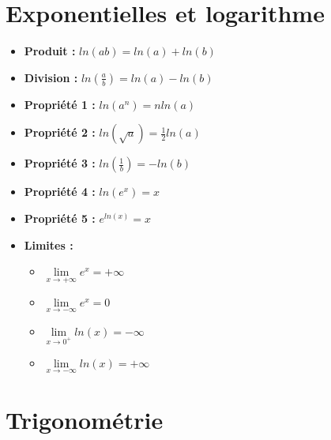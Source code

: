\documentclass[12]{article}%
\theoremstyle{plain}
\theoremstyle{definition}
\theoremstyle{remark}
\begin{document}
\section{Exponentielles et logarithme}
\large
\begin{itemize}
	\item \textbf{Produit :} \( \boxed{ln(ab) = ln(a) + ln(b)} \)
	\item \textbf{Division :} \( \boxed{ln(\frac{a}{b}) = ln(a) - ln(b)} \)
	\item \textbf{Propriété 1 :} \( \boxed{ln(a^{n}) = nln(a)} \)
	\item \textbf{Propriété 2 :} \( \boxed{ln(\sqrt{a}) = \frac{1}{2}ln(a)} \)
	\item \textbf{Propriété 3 :} \( \boxed{ln(\frac{1}{b}) = -ln(b)} \)
	\item \textbf{Propriété 4 :} \( \boxed{ln(e^{x}) = x} \)
	\item \textbf{Propriété 5 :} \( \boxed{e^{ln(x)} = x} \)
	\item \textbf{Limites :}
	\begin{itemize}
		\item \( \boxed{\lim\limits_{x \to +\infty} e^{x} = +\infty} \)
		\item \( \boxed{\lim\limits_{x \to -\infty} e^{x} = 0} \)
		
		\item \( \boxed{\lim\limits_{x \to 0^{+}} ln(x) = -\infty} \)
		\item \( \boxed{\lim\limits_{x \to -\infty} ln(x) = +\infty} \)
	\end{itemize}
\end{itemize}

\newpage
\section{Trigonométrie}
\large
\end{document}
